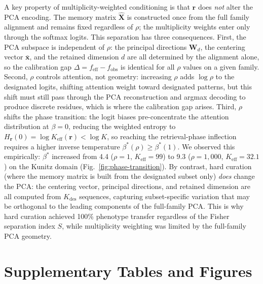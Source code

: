 A key property of multiplicity-weighted conditioning is that $\mathbf{r}$
does \emph{not} alter the PCA encoding. The memory matrix
$\hat{\mathbf{X}}$ is constructed once from the full family alignment and
remains fixed regardless of $\rho$; the multiplicity weights enter only
through the softmax logits. This separation has three consequences.
First, the PCA subspace is independent of $\rho$: the principal directions
$\mathbf{W}_d$, the centering vector $\bar{\mathbf{x}}$, and the retained
dimension $d$ are all determined by the alignment alone, so the calibration
gap $\Delta = f_{\mathrm{eff}} - f_{\mathrm{obs}}$ is identical for all
$\rho$ values on a given family. Second, $\rho$ controls attention, not
geometry: increasing $\rho$ adds $\log\rho$ to the designated logits, shifting
attention weight toward designated patterns, but this shift must still pass
through the PCA reconstruction and argmax decoding to produce discrete
residues, which is where the calibration gap arises. Third, $\rho$ shifts the
phase transition: the logit biases pre-concentrate the attention distribution
at $\beta = 0$, reducing the weighted entropy to
$H_{\mathbf{r}}(0) = \log K_{\mathrm{eff}}(\mathbf{r}) < \log K$, so
reaching the retrieval-phase inflection requires a higher inverse temperature
$\beta^{*}(\rho) \geq \beta^{*}(1)$. We observed this empirically:
$\beta^{*}$ increased from 4.4 ($\rho=1$, $K_{\mathrm{eff}} = 99$) to 9.3
($\rho=1{,}000$, $K_{\mathrm{eff}} = 32.1$) on the Kunitz domain
(Fig.~\ref{fig:phase-transition}). By contrast, hard curation (where the
memory matrix is built from the designated subset only) \emph{does} change
the PCA: the centering vector, principal directions, and retained dimension
are all computed from $K_{\mathrm{des}}$ sequences, capturing
subset-specific variation that may be orthogonal to the leading components
of the full-family PCA. This is why hard curation achieved 100\% phenotype
transfer regardless of the Fisher separation index $S$, while multiplicity
weighting was limited by the full-family PCA geometry.

\section{Supplementary Tables and Figures}\label{app:tables-figures}

